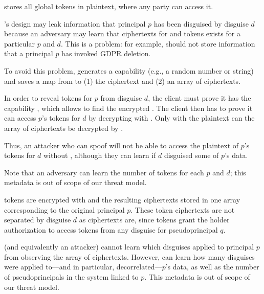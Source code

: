 \sys stores all global  tokens in plaintext, where any party can access it.

\sys's design may leak information that principal $p$ has been disguised by disguise
$d$ because an adversary may learn that ciphertexts for  and  tokens exists for a particular $p$ and $d$.
This is a problem: for example, \sys should not store information that a principal $p$ has
invoked GDPR deletion.

To avoid this problem, \sys generates a capability  (e.g., a random number or string)
and saves a map from  to (1) the  ciphertext and (2) an array of 
ciphertexts.

In order to reveal tokens for $p$ from disguise $d$, the client must prove it has the capability
, which allows \sys to find the encrypted . The client then has to prove it can
access $p$'s tokens for $d$ by decrypting  with .  Only with the
plaintext  can the array of  ciphertexts be decrypted by \sys.

Thus, an attacker who can spoof  will not be able to access the plaintext of $p$'s tokens for $d$ without
, although they can learn if $d$ disguised some of $p$'s data.

Note that an adversary can learn the number of  tokens for each $p$ and $d$; this
metadata is out of scope of our threat model.

 tokens are encrypted with  and the resulting ciphertexts stored in one array
corresponding to the original principal $p$. These token ciphertexts are not separated by disguise
$d$ as  ciphertexts are, since  tokens grant the holder authorization to access
tokens from any disguise for pseudoprincipal $q$.

\sys (and equivalently an attacker) cannot learn which disguises applied to principal $p$ from
observing the array of  ciphertexts. However, \sys can learn how many disguises were
applied to---and in particular, decorrelated---$p$'s data, as well as the number of pseudoprincipals
in the system linked to $p$. This metadata is out of scope of our threat model.

